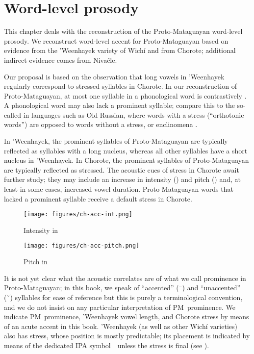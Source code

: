 \chapter{Word-level prosody} \label{prosody}
This chapter deals with the reconstruction of the Proto-Mataguayan word-level prosody. We reconstruct word-level accent for Proto-Mataguayan based on evidence from the ’Weenhayek variety of Wichí and from Chorote; additional indirect evidence comes from Nivaĉle.

Our proposal is based on the observation that long vowels in ’Weenhayek regularly correspond to stressed syllables in Chorote. In our reconstruction of Proto-Mataguayan, at most one syllable in a phonological word is contrastively . A phonological word may also lack a prominent syllable; compare this to the so-called  in languages such as Old Russian, where words with a stress (``orthotonic words'') are opposed to words without a stress, or enclinomena \citep{RJ63}.

In ’Weenhayek, the prominent syllables of Proto-Mataguayan are typically reflected as syllables with a long nucleus, whereas all other syllables have a short nucleus in ’Weenhayek. In Chorote, the prominent syllables of Proto-Mataguayan are typically reflected as stressed. The acoustic cues of stress in Chorote await further study; they may include an increase in intensity () and pitch () and, at least in some cases, increased vowel duration. Proto-Mataguayan words that lacked a prominent syllable receive a default stress in Chorote.

\begin{figure}[ht]
\hspace*{1cm}\texttt{[image: figures/ch-acc-int.png]}
\caption{Intensity in }
\label{fig-ch-acc-int}
\end{figure}

\begin{figure}[ht]
\hspace*{1cm}\texttt{[image: figures/ch-acc-pitch.png]}
\caption{Pitch in }
\label{fig-ch-acc-pitch}
\end{figure}

It is not yet clear what the acoustic correlates are of what we call prominence in Proto-Mataguayan; in this book, we speak of ``accented'' (¯) and ``unaccented'' (˘) syllables for ease of reference but this is purely a terminological convention, and we do not insist on any particular interpretation of PM~prominence. We indicate PM~prominence, ’Weenhayek vowel length, and Chorote stress by means of an acute accent in this book. ’Weenhayek (as well as other Wichí varieties) also has stress, whose position is mostly predictable; its placement is indicated by means of the dedicated IPA symbol~~unless the stress is final (see ).


